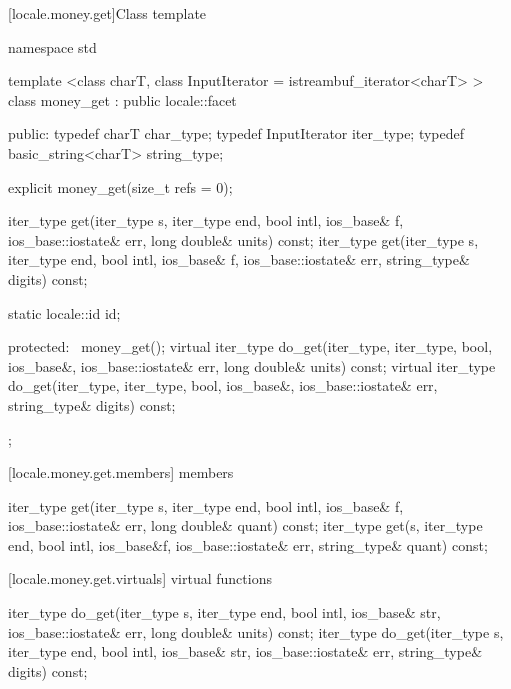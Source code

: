 [locale.money.get]{Class template }

%
\begin{codeblock}
namespace std {
  template <class charT,
    class InputIterator = istreambuf_iterator<charT> >
  class money_get : public locale::facet {
  public:
    typedef charT               char_type;
    typedef InputIterator       iter_type;
    typedef basic_string<charT> string_type;

    explicit money_get(size_t refs = 0);

    iter_type get(iter_type s, iter_type end, bool intl,
                  ios_base& f, ios_base::iostate& err,
                  long double& units) const;
    iter_type get(iter_type s, iter_type end, bool intl,
                  ios_base& f, ios_base::iostate& err,
                  string_type& digits) const;

    static locale::id id;

  protected:
    ~money_get();
    virtual iter_type do_get(iter_type, iter_type, bool, ios_base&,
                             ios_base::iostate& err, long double& units) const;
    virtual iter_type do_get(iter_type, iter_type, bool, ios_base&,
                             ios_base::iostate& err, string_type& digits) const;
  };
}
\end{codeblock}

[locale.money.get.members]{ members}

%
%
\begin{itemdecl}
iter_type get(iter_type s, iter_type end, bool intl,
              ios_base& f, ios_base::iostate& err,
              long double& quant) const;
iter_type get(s, iter_type end, bool intl, ios_base&f,
              ios_base::iostate& err, string_type& quant) const;
\end{itemdecl}

\begin{itemdescr}
\pnum
\returns
{}
\end{itemdescr}

[locale.money.get.virtuals]{ virtual functions}

%
%
\begin{itemdecl}
iter_type do_get(iter_type s, iter_type end, bool intl,
                 ios_base& str, ios_base::iostate& err,
                 long double& units) const;
iter_type do_get(iter_type s, iter_type end, bool intl,
                 ios_base& str, ios_base::iostate& err,
                 string_type& digits) const;
\end{itemdecl}

